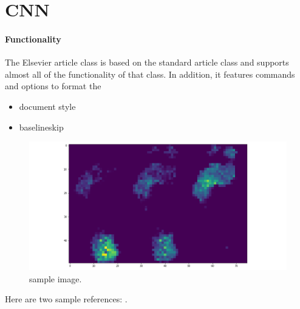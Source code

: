 \section{CNN}



\paragraph{Functionality} The Elsevier article class is based on the standard article class and supports almost all of the functionality of that class. In addition, it features commands and options to format the
\begin{itemize}%
\item document style
\item baselineskip
\end{itemize}



\begin{figure}
    \centering
    \begin{minipage}[b]{.5\textwidth}
        \includegraphics[width=\textwidth]{figures/project/frame1.png}
    \end{minipage}
    \caption{sample image.}
    \label{fig:Stepscan_dataset}
\end{figure}


Here are two sample references: \cite{SKazemii/EE6563}.